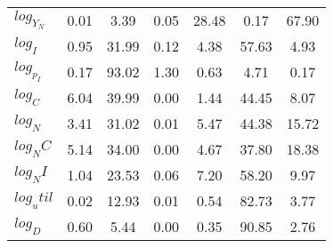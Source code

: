 \begin{center}
\begin{longtable}{lcccccc}
$log_Y_N   $	 & 	        0.01	 & 	        3.39	 & 	        0.05	 & 	       28.48	 & 	        0.17	 & 	       67.90 \\ 
$log_I     $	 & 	        0.95	 & 	       31.99	 & 	        0.12	 & 	        4.38	 & 	       57.63	 & 	        4.93 \\ 
$log_p_I   $	 & 	        0.17	 & 	       93.02	 & 	        1.30	 & 	        0.63	 & 	        4.71	 & 	        0.17 \\ 
$log_C     $	 & 	        6.04	 & 	       39.99	 & 	        0.00	 & 	        1.44	 & 	       44.45	 & 	        8.07 \\ 
$log_N     $	 & 	        3.41	 & 	       31.02	 & 	        0.01	 & 	        5.47	 & 	       44.38	 & 	       15.72 \\ 
$log_NC    $	 & 	        5.14	 & 	       34.00	 & 	        0.00	 & 	        4.67	 & 	       37.80	 & 	       18.38 \\ 
$log_NI    $	 & 	        1.04	 & 	       23.53	 & 	        0.06	 & 	        7.20	 & 	       58.20	 & 	        9.97 \\ 
$log_util  $	 & 	        0.02	 & 	       12.93	 & 	        0.01	 & 	        0.54	 & 	       82.73	 & 	        3.77 \\ 
$log_D     $	 & 	        0.60	 & 	        5.44	 & 	        0.00	 & 	        0.35	 & 	       90.85	 & 	        2.76 \\ 
\end{longtable}
 \end{center}
